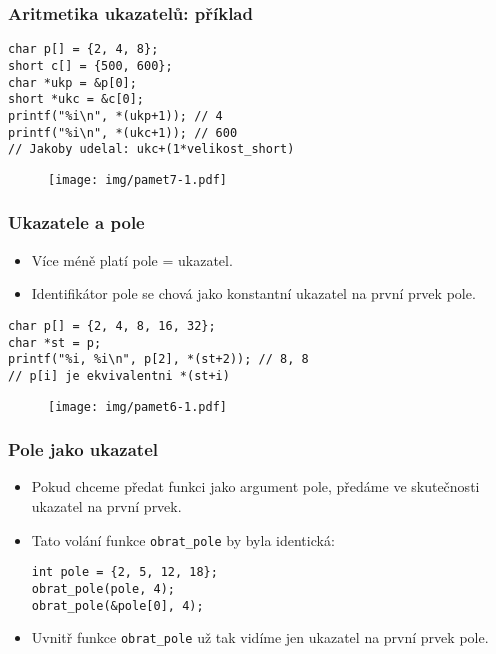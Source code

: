 \documentclass{beamer}
\newenvironment{itemizex}%
  {\large \begin{itemize}%
    \setlength{\itemsep}{8pt}%
    \setlength{\parskip}{8pt}}%
  {\end{itemize}}
\begin{document}
\begin{frame}[t,fragile]\frametitle{Aritmetika ukazatelů: příklad} 
\begin{verbatim} 
char p[] = {2, 4, 8};
short c[] = {500, 600};
char *ukp = &p[0];
short *ukc = &c[0];
printf("%i\n", *(ukp+1)); // 4
printf("%i\n", *(ukc+1)); // 600
// Jakoby udelal: ukc+(1*velikost_short)
\end{verbatim}

\begin{figure}[htb]
    \centering
    \texttt{[image: img/pamet7-1.pdf]}
\end{figure}
\end{frame}

\begin{frame}[t,fragile]\frametitle{Ukazatele a pole} 
    \begin{itemizex}
        \item Více méně platí pole = ukazatel.
        \item Identifikátor pole se chová jako konstantní ukazatel na první prvek pole.
    \end{itemizex}

\begin{verbatim} 
char p[] = {2, 4, 8, 16, 32};
char *st = p;
printf("%i, %i\n", p[2], *(st+2)); // 8, 8
// p[i] je ekvivalentni *(st+i)
\end{verbatim}
\begin{figure}[htb]
    \centering
    \texttt{[image: img/pamet6-1.pdf]}
\end{figure}
\end{frame}

\begin{frame}[t,fragile]\frametitle{Pole jako ukazatel} 
    \begin{itemizex}
        \item Pokud chceme předat funkci jako argument pole, předáme ve skutečnosti ukazatel na první prvek.
        \item Tato volání funkce \texttt{obrat\_pole} by byla identická:
\begin{verbatim} 
int pole = {2, 5, 12, 18};
obrat_pole(pole, 4);
obrat_pole(&pole[0], 4);
\end{verbatim}
    \item Uvnitř funkce \texttt{obrat\_pole} už tak vidíme jen ukazatel na první prvek pole.
    \end{itemizex}
\end{frame}
\end{document}
